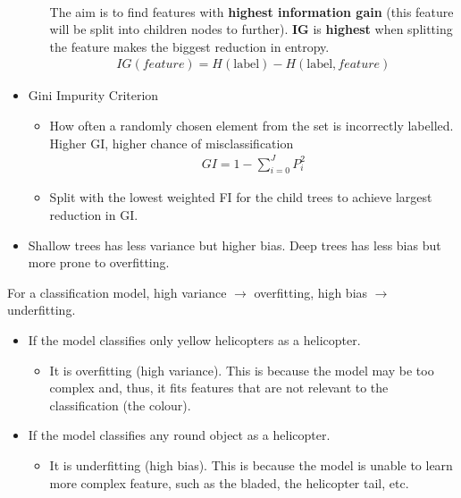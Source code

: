 \documentclass[a4paper,10pt]{article}
\begin{document}
\begin{itemize}
\begin{itemize}
\begin{gather*}
            \end{gather*}
            The aim is to find features with \textbf{highest information gain} (this feature will be split into children nodes to further). \textbf{IG} is \textbf{highest} when splitting the feature makes the biggest reduction in entropy.
            \begin{gather*}
                IG(feature) = H(\text{label}) - H(\text{label}, feature)
            \end{gather*}
        \end{itemize}
        \vspace*{-0.4cm}
    \item Gini Impurity Criterion
        \begin{itemize}
            \item How often a randomly chosen element from the set is incorrectly labelled. Higher GI, higher chance of misclassification
            \begin{gather*}
                GI = 1-\sum_{i=0}^{J}P_i^2
            \end{gather*}
            \vspace*{-0.4cm}
            \item Split with the lowest weighted FI for the child trees to achieve largest reduction in GI.
        \end{itemize}
    \item Shallow trees has less variance but higher bias. Deep trees has less bias but more prone to overfitting. 
\end{itemize}

\par
For a classification model, high variance $\rightarrow$ overfitting, high bias $\rightarrow$ underfitting. 
\begin{itemize}
    \item If the model classifies only yellow helicopters as a helicopter.
        \begin{itemize}
            \item It is overfitting (high variance). This is because the model may be too complex and, thus, it fits features that are not relevant to the classification (the colour).
        \end{itemize}
    \item If the model classifies any round object as a helicopter.
        \begin{itemize}
            \item It is underfitting (high bias). This is because the model is unable to learn more complex feature, such as the bladed, the helicopter tail, etc.
        \end{itemize}
\end{itemize}
\end{document}
